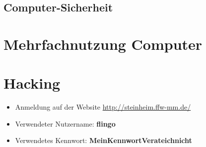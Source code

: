 \subsection{Computer-Sicherheit}


\section{Mehrfachnutzung Computer}


\section{Hacking}

\begin{frame}
\begin{itemize}
	\item Anmeldung auf der Website \href{http://steinheim.ffw-mm.de/}{http://steinheim.ffw-mm.de/}
	\item Verwendeter Nutzername: \textbf{flingo}
	\item Verwendetes Kennwort: \textbf{MeinKennwortVerateichnicht}
\end{itemize}
\end{frame}


